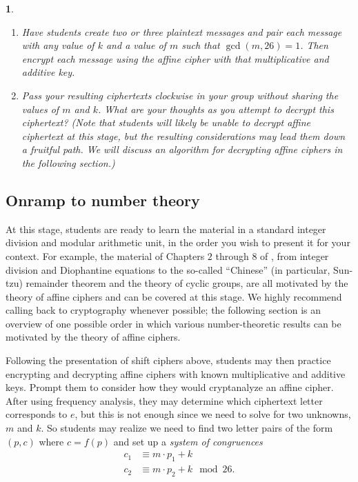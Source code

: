 \documentclass[11pt]{article}
\theoremstyle{plain}
\theoremstyle{remark}
\theoremstyle{definition}
\theoremstyle{definition}
\theoremstyle{definition}
\theoremstyle{plain}
\theoremstyle{plain}
\theoremstyle{plain}
\newtheorem{act}[thm]{\protect\activityname}
\theoremstyle{definition}
\providecommand{\activityname}{Activity}
\begin{document}
\begin{act}
\begin{enumerate}
\item Have students create two or three plaintext 	messages and pair each message with any value of $k$ and a value of $m$ such that $\gcd(m,26)=1$. Then encrypt each message using the affine cipher with that multiplicative and additive key.
\item Pass your resulting ciphertexts clockwise in your group without sharing the values of $m$ and $k$. What are your thoughts as you attempt to decrypt this ciphertext? (Note that students will likely be unable to decrypt affine ciphertext at this stage, but the resulting considerations may lead them down a fruitful path. We will discuss an algorithm for decrypting affine ciphers in the following section.)
\end{enumerate}
\end{act}


\subsection{Onramp to number theory}

At this stage, students are ready to learn the material in a standard
integer division and modular arithmetic unit, in the order you wish
to present it for your context. For example, the material of Chapters
$2$ through $8$ of \cite{crismanNumberTheoryContext2021}, from
integer division and Diophantine equations to the so-called ``Chinese''
(in particular, Sun-tzu) remainder theorem and the theory of cyclic
groups, are all motivated by the theory of affine ciphers and can
be covered at this stage. We highly recommend calling back to cryptography
whenever possible; the following section is an overview of one possible
order in which various number-theoretic results can be motivated by
the theory of affine ciphers.

Following the presentation of shift ciphers above, students may then
practice encrypting and decrypting affine ciphers with known multiplicative
and additive keys. Prompt them to consider how they would cryptanalyze
an affine cipher. After using frequency analysis, they may determine
which ciphertext letter corresponds to $e$, but this is not enough
since we need to solve for two unknowns, $m$ and $k$. So students
may realize we need to find two letter pairs of the form $(p,c)$ where $c=f(p)$
and set up a \textit{system of congruences
\begin{align}
c_{1} & \equiv m\cdot p_{1}+k\nonumber \\
c_{2} & \equiv m\cdot p_{2}+k\mod26.\label{KI-eq:affine-cipher-system}
\end{align}
}
\end{document}
